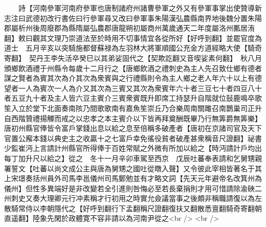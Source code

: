 　　詩【河南參軍河南府參軍也唐制諸府州諸曹參軍之外又有參軍事掌出使贊導新志注曰武德初改行書佐曰行參軍尋又改曰參軍事朱陽漢弘農縣南界地後魏分置朱陽郡屬析州後周廢郡為縣隋屬弘農郡唐龍朔初屬商州萬歲通天二年度屬洛州匭居洧翻】敕曰觀其文理乃崇道法至於時用不切事情宜各從所好【好呼到翻】並罷官度為道士　五月辛亥以突騎施都督蘇禄為左羽林大將軍順國公充金方道經略大使【騎奇寄翻】　契丹王李失活卒癸巳以其弟娑固代之【契欺訖翻又音喫娑素何翻】　秋八月頒鄉飲酒禮于州縣令每歲十二月行之【唐鄉飲酒之禮刺史為主人先召致仕鄉有德者謀之賢者為賓其次為介其次為衆賓與之行禮縣則令為主人鄉之老人年六十以上有德望者一人為賓次一人為介又其次為三賓又其次為衆賓年六十者三豆七十者四豆八十者五豆九十者及主人皆六豆主賓介三賓衆賓既升即席工持瑟升自階就位鼔鹿鳴卒歌笙入立於堂下北面奏南陔乃間歌歌南有嘉魚笙崇丘乃合樂周南關雎召南鵲巢司正升自西階贊禮揚觶而戒之以忠孝之本主賓介以下皆再拜奠酬既畢乃行無筭爵無筭樂】　唐初州縣官俸皆令富戶掌錢出息以給之息至倍稱多破產者【唐初在京諸司官及天下官置公廨本錢以典史主之收贏十之七富戶幸免徭役貧者破產甚衆稱音尺證翻】祕書少監崔沔上言請計州縣官所得俸于百姓常賦之外微有所加以給之【時沔請計戶均出每丁加升尺以給之】從之　冬十一月辛卯車駕至西京　戊辰吐蕃奉表請和乞舅甥親署誓文【吐蕃以尚文成公主與唐為舅甥之國吐從暾入聲】又令彼此宰相皆著名于其上宋璟奏括州員外司馬李邕儀州司馬鄭勉並有才略文詞【先天元年避帝名改箕州為儀州】但性多異端好是非改變若全引進則咎悔必至若長棄捐則才用可惜請除渝硤二州刺史又奏大理卿元行冲素稱才行初用之時實允僉議當事之後頗非稱職請復以為左散騎常侍以李朝隱代之【好呼到翻行下孟翻稱尺證翻復扶又翻散悉亶翻騎奇寄翻朝直遥翻】陸象先閑於政體寛不容非請以為河南尹從之<br />
<br />
